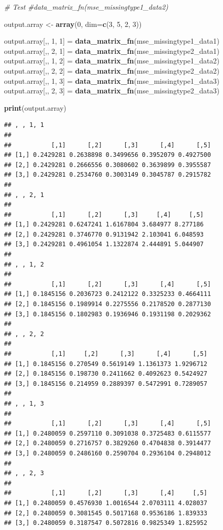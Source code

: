 \documentclass[]{article}
\newenvironment{Shaded}{\begin{snugshade}}{\end{snugshade}}
\newcommand{\KeywordTok}[1]{\textcolor[rgb]{0.13,0.29,0.53}{\textbf{#1}}}
\newcommand{\DataTypeTok}[1]{\textcolor[rgb]{0.13,0.29,0.53}{#1}}
\newcommand{\DecValTok}[1]{\textcolor[rgb]{0.00,0.00,0.81}{#1}}
\newcommand{\StringTok}[1]{\textcolor[rgb]{0.31,0.60,0.02}{#1}}
\newcommand{\CommentTok}[1]{\textcolor[rgb]{0.56,0.35,0.01}{\textit{#1}}}
\newcommand{\NormalTok}[1]{#1}
\begin{document}
\begin{Shaded}
\begin{Highlighting}[]
\CommentTok{# Test}
\CommentTok{#data_matrix_fn(mse_missingtype1_data2)}

\NormalTok{output.array <-}\StringTok{ }\KeywordTok{array}\NormalTok{(}\DecValTok{0}\NormalTok{, }\DataTypeTok{dim=}\KeywordTok{c}\NormalTok{(}\DecValTok{3}\NormalTok{, }\DecValTok{5}\NormalTok{, }\DecValTok{2}\NormalTok{, }\DecValTok{3}\NormalTok{))}

\NormalTok{output.array[,, }\DecValTok{1}\NormalTok{, }\DecValTok{1}\NormalTok{] =}\StringTok{ }\KeywordTok{data_matrix_fn}\NormalTok{(mse_missingtype1_data1)}
\NormalTok{output.array[,, }\DecValTok{2}\NormalTok{, }\DecValTok{1}\NormalTok{] =}\StringTok{ }\KeywordTok{data_matrix_fn}\NormalTok{(mse_missingtype2_data1)}
\NormalTok{output.array[,, }\DecValTok{1}\NormalTok{, }\DecValTok{2}\NormalTok{] =}\StringTok{ }\KeywordTok{data_matrix_fn}\NormalTok{(mse_missingtype1_data2)}
\NormalTok{output.array[,, }\DecValTok{2}\NormalTok{, }\DecValTok{2}\NormalTok{] =}\StringTok{ }\KeywordTok{data_matrix_fn}\NormalTok{(mse_missingtype2_data2)}
\NormalTok{output.array[,, }\DecValTok{1}\NormalTok{, }\DecValTok{3}\NormalTok{] =}\StringTok{ }\KeywordTok{data_matrix_fn}\NormalTok{(mse_missingtype1_data3)}
\NormalTok{output.array[,, }\DecValTok{2}\NormalTok{, }\DecValTok{3}\NormalTok{] =}\StringTok{ }\KeywordTok{data_matrix_fn}\NormalTok{(mse_missingtype2_data3)}

\KeywordTok{print}\NormalTok{(output.array)}
\end{Highlighting}
\end{Shaded}

\begin{verbatim}
## , , 1, 1
## 
##           [,1]      [,2]      [,3]      [,4]      [,5]
## [1,] 0.2429281 0.2638898 0.3499656 0.3952079 0.4927500
## [2,] 0.2429281 0.2666556 0.3080602 0.3639899 0.3955587
## [3,] 0.2429281 0.2534760 0.3003149 0.3045787 0.2915782
## 
## , , 2, 1
## 
##           [,1]      [,2]      [,3]     [,4]     [,5]
## [1,] 0.2429281 0.6247241 1.6167804 3.684977 8.277186
## [2,] 0.2429281 0.3746770 0.9131942 2.103041 6.048593
## [3,] 0.2429281 0.4961054 1.1322874 2.444891 5.044907
## 
## , , 1, 2
## 
##           [,1]      [,2]      [,3]      [,4]      [,5]
## [1,] 0.1845156 0.2036723 0.2412122 0.3325233 0.4664111
## [2,] 0.1845156 0.1989914 0.2275556 0.2178520 0.2877130
## [3,] 0.1845156 0.1802983 0.1936946 0.1931198 0.2029362
## 
## , , 2, 2
## 
##           [,1]     [,2]      [,3]      [,4]      [,5]
## [1,] 0.1845156 0.270549 0.5619149 1.1361373 1.9296712
## [2,] 0.1845156 0.198730 0.2411662 0.4092623 0.5424927
## [3,] 0.1845156 0.214959 0.2889397 0.5472991 0.7289057
## 
## , , 1, 3
## 
##           [,1]      [,2]      [,3]      [,4]      [,5]
## [1,] 0.2480059 0.2597110 0.3091038 0.3725483 0.6115577
## [2,] 0.2480059 0.2716757 0.3829260 0.4704838 0.3914477
## [3,] 0.2480059 0.2486160 0.2590704 0.2936104 0.2948012
## 
## , , 2, 3
## 
##           [,1]      [,2]      [,3]      [,4]     [,5]
## [1,] 0.2480059 0.4576930 1.0016544 2.0703111 4.028037
## [2,] 0.2480059 0.3081545 0.5017168 0.9536186 1.839333
## [3,] 0.2480059 0.3187547 0.5072816 0.9825349 1.825952
\end{verbatim}
\end{document}
